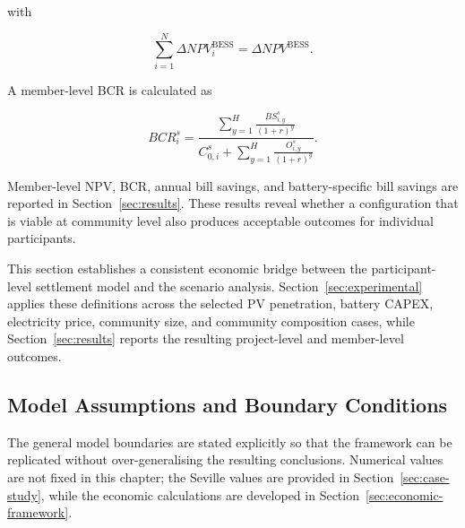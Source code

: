 with

\begin{equation}
\sum_{i=1}^{N}\Delta NPV_i^{\mathrm{BESS}}
=\Delta NPV^{\mathrm{BESS}}.
\label{eq:ch5_member_incremental_npv_closure}
\end{equation}

A member-level BCR is calculated as

\begin{equation}
BCR_i^{s}=
\frac{\displaystyle\sum_{y=1}^{H}\frac{BS_{i,y}^{s}}{(1+r)^y}}
{\displaystyle C_{0,i}^{s}+\sum_{y=1}^{H}\frac{O_{i,y}^{s}}{(1+r)^y}}.
\label{eq:ch5_member_bcr}
\end{equation}

Member-level NPV, BCR, annual bill savings, and battery-specific bill savings are reported in Section~\ref{sec:results}. These results reveal whether a configuration that is viable at community level also produces acceptable outcomes for individual participants.

This section establishes a consistent economic bridge between the participant-level settlement model and the scenario analysis. Section~\ref{sec:experimental} applies these definitions across the selected PV penetration, battery CAPEX, electricity price, community size, and community composition cases, while Section~\ref{sec:results} reports the resulting project-level and member-level outcomes.

\subsection{Model Assumptions and Boundary Conditions}
\label{sec:model_assumptions_boundary_conditions}

The general model boundaries are stated explicitly so that the framework can be replicated without over-generalising the resulting conclusions. Numerical values are not fixed in this chapter; the Seville values are provided in Section~\ref{sec:case-study}, while the economic calculations are developed in Section~\ref{sec:economic-framework}.

